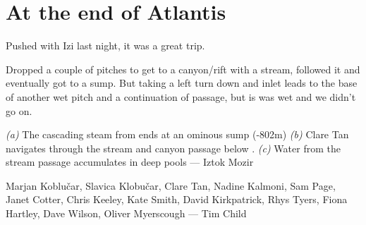 \section{At the end of Atlantis} 
Pushed  with Izi last night, it was a great trip. 

Dropped a couple of pitches to get to a canyon/rift with a stream, followed it and eventually got to a sump. But taking a left turn down and inlet leads to the base of another wet pitch and a continuation of passage, but is was wet and we didn’t go on. 

\begin{pagefigure}
      \checkoddpage \ifoddpage \forcerectofloat \else \forceversofloat \fi
      \centering
    \begin{subfigure}[t]{\textwidth}
    \centering
        \caption{} \label{lethe sifon 2}
    \end{subfigure}
    
          \vspace{0.3cm}
          
    \begin{subfigure}[t]{0.555\textwidth}
        \centering
        \caption{} \label{clare in lethe}
    \end{subfigure}
    \hfill
    \begin{subfigure}[t]{0.418\textwidth}
        \centering
        \caption{} \label{lethe canyon}
    \end{subfigure}

    \caption{
    \emph{(a)} The cascading steam from \protect{} ends at an ominous sump (-802m)
    \emph{(b)} Clare Tan navigates through the stream and canyon passage below \protect{}.
    \emph{(c)} Water from the stream passage accumulates in deep pools --- Iztok Mozir }
\end{pagefigure}

\begin{pagefigure}
      \checkoddpage \ifoddpage \forcerectofloat \else \forceversofloat \fi
      \centering
       \label{end expo}
  \caption{Marjan Koblu\v{c}ar, Slavica Klobu\v{c}ar, Clare Tan, Nadine Kalmoni, Sam Page, Janet Cotter, Chris Keeley, Kate Smith, David Kirkpatrick, Rhys Tyers, Fiona Hartley, Dave Wilson, Oliver Myerscough --- Tim Child }
\end{pagefigure}


